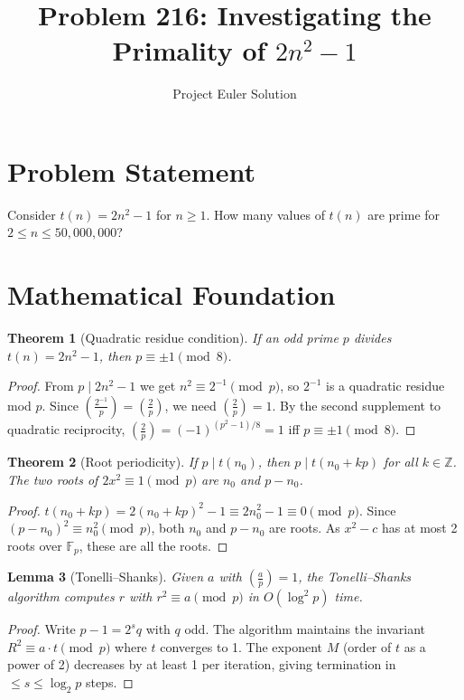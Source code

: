 \documentclass[12pt]{article}
\title{Problem 216: Investigating the Primality of $2n^2-1$}
\author{Project Euler Solution}
\date{}
\newtheorem{theorem}{Theorem}
\newtheorem{lemma}[theorem]{Lemma}
\begin{document}
\maketitle

\section{Problem Statement}

Consider $t(n) = 2n^2-1$ for $n \geq 1$. How many values of $t(n)$ are prime for $2 \leq n \leq 50{,}000{,}000$?

\section{Mathematical Foundation}

\begin{theorem}[Quadratic residue condition]
If an odd prime $p$ divides $t(n) = 2n^2-1$, then $p \equiv \pm 1 \pmod{8}$.
\end{theorem}

\begin{proof}
From $p \mid 2n^2-1$ we get $n^2 \equiv 2^{-1}\pmod{p}$, so $2^{-1}$ is a quadratic residue mod $p$. Since $\left(\frac{2^{-1}}{p}\right) = \left(\frac{2}{p}\right)$, we need $\left(\frac{2}{p}\right) = 1$. By the second supplement to quadratic reciprocity, $\left(\frac{2}{p}\right) = (-1)^{(p^2-1)/8} = 1$ iff $p \equiv \pm 1\pmod{8}$.
\end{proof}

\begin{theorem}[Root periodicity]
If $p \mid t(n_0)$, then $p \mid t(n_0 + kp)$ for all $k \in \mathbb{Z}$. The two roots of $2x^2 \equiv 1\pmod{p}$ are $n_0$ and $p - n_0$.
\end{theorem}

\begin{proof}
$t(n_0+kp) = 2(n_0+kp)^2 - 1 \equiv 2n_0^2-1 \equiv 0\pmod{p}$. Since $(p-n_0)^2 \equiv n_0^2\pmod{p}$, both $n_0$ and $p-n_0$ are roots. As $x^2-c$ has at most 2 roots over $\mathbb{F}_p$, these are all the roots.
\end{proof}

\begin{lemma}[Tonelli--Shanks]
Given $a$ with $\left(\frac{a}{p}\right)=1$, the Tonelli--Shanks algorithm computes $r$ with $r^2 \equiv a\pmod{p}$ in $O(\log^2 p)$ time.
\end{lemma}

\begin{proof}
Write $p-1 = 2^s q$ with $q$ odd. The algorithm maintains the invariant $R^2 \equiv a \cdot t\pmod{p}$ where $t$ converges to 1. The exponent $M$ (order of $t$ as a power of 2) decreases by at least 1 per iteration, giving termination in $\leq s \leq \log_2 p$ steps.
\end{proof}
\end{document}
